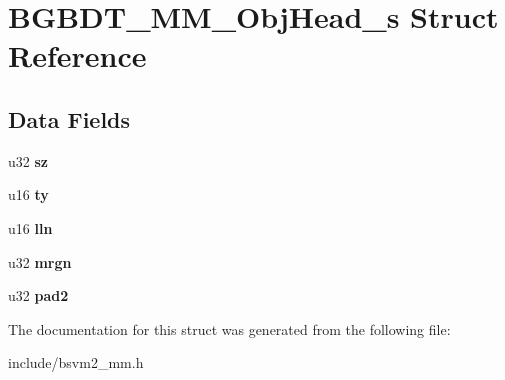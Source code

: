 \hypertarget{structBGBDT__MM__ObjHead__s}{\section{B\-G\-B\-D\-T\-\_\-\-M\-M\-\_\-\-Obj\-Head\-\_\-s Struct Reference}
\label{structBGBDT__MM__ObjHead__s}
}
\subsection*{Data Fields}
\begin{DoxyCompactItemize}
\item 
\hypertarget{structBGBDT__MM__ObjHead__s_aab09243661b1694b7bbafa0da66e1f12}{u32 {\bfseries sz}}\label{structBGBDT__MM__ObjHead__s_aab09243661b1694b7bbafa0da66e1f12}

\item 
\hypertarget{structBGBDT__MM__ObjHead__s_a19251bf1420500ed74f7af8bbf4f8aef}{u16 {\bfseries ty}}\label{structBGBDT__MM__ObjHead__s_a19251bf1420500ed74f7af8bbf4f8aef}

\item 
\hypertarget{structBGBDT__MM__ObjHead__s_acda187c50068956c3a6a6051d0b851c7}{u16 {\bfseries lln}}\label{structBGBDT__MM__ObjHead__s_acda187c50068956c3a6a6051d0b851c7}

\item 
\hypertarget{structBGBDT__MM__ObjHead__s_a10d984977de54b423d820b46c6ece9f7}{u32 {\bfseries mrgn}}\label{structBGBDT__MM__ObjHead__s_a10d984977de54b423d820b46c6ece9f7}

\item 
\hypertarget{structBGBDT__MM__ObjHead__s_ac56ff105553382e3d5c44602697ab645}{u32 {\bfseries pad2}}\label{structBGBDT__MM__ObjHead__s_ac56ff105553382e3d5c44602697ab645}

\end{DoxyCompactItemize}


The documentation for this struct was generated from the following file\-:\begin{DoxyCompactItemize}
\item 
include/bsvm2\-\_\-mm.\-h\end{DoxyCompactItemize}
